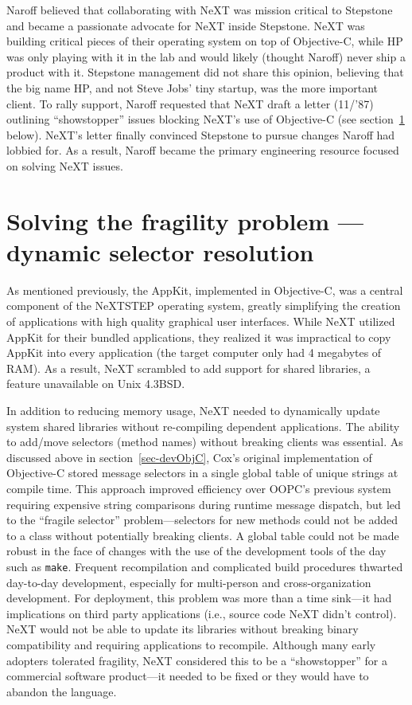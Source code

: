 \documentclass[acmsmall]{acmart}\settopmatter{}
\begin{document}
Naroff believed that collaborating with NeXT was mission critical to Stepstone and became a passionate advocate for NeXT inside Stepstone. NeXT was building critical pieces of their operating system on top of Objective-C, while HP was only playing with it in the lab and would likely (thought Naroff) never ship a product with it. Stepstone management did not share this opinion, believing that the big name HP, and not Steve Jobs' tiny startup, was the more important client. To rally support, Naroff requested that NeXT draft a letter (11/'87) outlining ``showstopper'' issues blocking NeXT's use of Objective-C (see section~\ref{sec-solvingfragility} below). NeXT's letter finally convinced Stepstone to pursue changes Naroff had lobbied for. As a result, Naroff became the primary engineering resource focused on solving NeXT issues.
\section{Solving the fragility problem --- dynamic selector resolution}
\label{sec-solvingfragility}
As mentioned previously, the AppKit, implemented in Objective-C, was a central component of the NeXTSTEP operating system, greatly simplifying the creation of applications with high quality graphical user interfaces. While NeXT utilized AppKit for their bundled applications, they realized it was impractical to copy AppKit into every application (the target computer only had 4 megabytes of RAM). As a result, NeXT scrambled to add support for shared libraries, a feature unavailable on Unix 4.3BSD. 

In addition to reducing memory usage, NeXT needed to dynamically update system shared libraries without re-compiling dependent applications. The ability to add/move selectors (method names) without breaking clients was essential. As discussed above in section~\ref{sec-devObjC}, Cox's original implementation of Objective-C stored message selectors in a single global table of unique strings at compile time. This approach improved efficiency over OOPC's previous system requiring expensive string comparisons during runtime message dispatch, but led to the ``fragile selector'' problem---selectors for new methods could not be added to a class without potentially breaking clients. A global table could not be made robust in the face of changes with the use of the development tools of the day such as \verb$make$. Frequent recompilation and complicated build procedures thwarted day-to-day development, especially for multi-person and cross-organization development. For deployment, this problem was more than a time sink---it had implications on third party applications (i.e., source code NeXT didn't control). NeXT would not be able to update its libraries without breaking binary compatibility and requiring applications to recompile. Although many early adopters tolerated fragility, NeXT considered this to be a ``showstopper'' for a commercial software product---it needed to be fixed or they would have to abandon the language.
\end{document}
